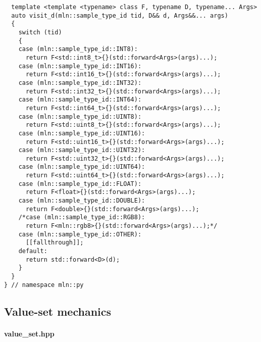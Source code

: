 \begin{verbatim}
  template <template <typename> class F, typename D, typename... Args>
  auto visit_d(mln::sample_type_id tid, D&& d, Args&&... args)
  {
    switch (tid)
    {
    case (mln::sample_type_id::INT8):
      return F<std::int8_t>{}(std::forward<Args>(args)...);
    case (mln::sample_type_id::INT16):
      return F<std::int16_t>{}(std::forward<Args>(args)...);
    case (mln::sample_type_id::INT32):
      return F<std::int32_t>{}(std::forward<Args>(args)...);
    case (mln::sample_type_id::INT64):
      return F<std::int64_t>{}(std::forward<Args>(args)...);
    case (mln::sample_type_id::UINT8):
      return F<std::uint8_t>{}(std::forward<Args>(args)...);
    case (mln::sample_type_id::UINT16):
      return F<std::uint16_t>{}(std::forward<Args>(args)...);
    case (mln::sample_type_id::UINT32):
      return F<std::uint32_t>{}(std::forward<Args>(args)...);
    case (mln::sample_type_id::UINT64):
      return F<std::uint64_t>{}(std::forward<Args>(args)...);
    case (mln::sample_type_id::FLOAT):
      return F<float>{}(std::forward<Args>(args)...);
    case (mln::sample_type_id::DOUBLE):
      return F<double>{}(std::forward<Args>(args)...);
    /*case (mln::sample_type_id::RGB8):
      return F<mln::rgb8>{}(std::forward<Args>(args)...);*/
    case (mln::sample_type_id::OTHER):
      [[fallthrough]];
    default:
      return std::forward<D>(d);
    }
  }
} // namespace mln::py
\end{verbatim}


\subsection{Value-set mechanics}
\label{appendix:static-dynamic-bridge.mm.vs}

\paragraph{value\_set.hpp}

